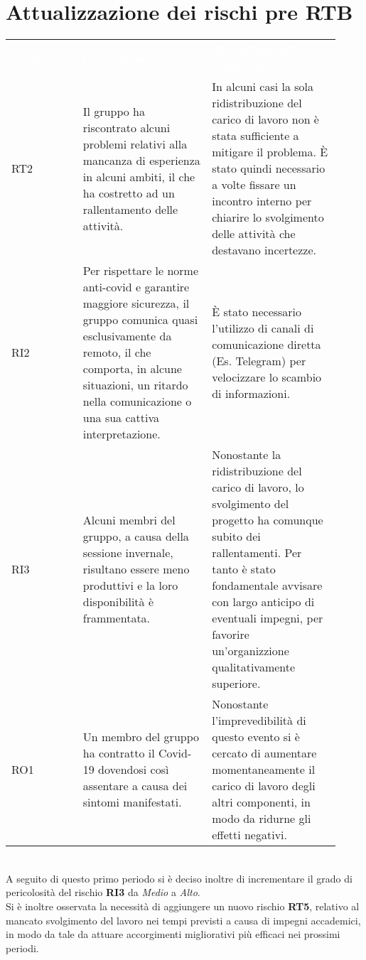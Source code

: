 \section{Attualizzazione dei rischi pre RTB}
\label{sec:AttualizzazioneRischiRTB}

{\renewcommand{\arraystretch}{1.5} \small
\begin{tabular}{ >{\centering}p{0.20\linewidth} | >{\centering}p{0.36\linewidth} | >{\centering}p{0.36\linewidth}}
	\rowcolor[RGB]{33, 73, 50}
	\textcolor{white}{\textbf{Codice}} & \textcolor{white}
	{\textbf{Descrizione}} & \textcolor{white}{\textbf{Accorginmenti migliorativi}}\tabularnewline
	\rowcolor[RGB]{216, 235, 171}
	RT2
    & Il gruppo ha riscontrato alcuni problemi relativi alla mancanza di esperienza in alcuni ambiti, il che ha costretto ad un rallentamento delle attività.  
    & In alcuni casi la sola ridistribuzione del carico di lavoro non è stata sufficiente a mitigare il problema. È stato quindi necessario a volte fissare un incontro interno per chiarire lo svolgimento delle attività che destavano incertezze.
    \tabularnewline
    \rowcolor[RGB]{233, 245, 206}
	RI2
    & Per rispettare le norme anti-covid e garantire maggiore sicurezza, il gruppo comunica quasi esclusivamente da remoto, il che comporta, in alcune situazioni, un ritardo nella comunicazione o una sua cattiva interpretazione.
    & È stato necessario l'utilizzo di canali di comunicazione diretta (Es. Telegram) per velocizzare lo scambio di informazioni. \tabularnewline
    \rowcolor[RGB]{216, 235, 171}
    RI3
	& Alcuni membri del gruppo, a causa della sessione invernale, risultano essere meno produttivi e la loro disponibilità è frammentata. 
    & Nonostante la ridistribuzione del carico di lavoro, lo svolgimento del progetto ha comunque subito dei rallentamenti. Per tanto è stato fondamentale avvisare con largo anticipo di eventuali impegni, per favorire un'organizzione qualitativamente superiore.
    \tabularnewline
	\rowcolor[RGB]{233, 245, 206}
    RO1
	& Un membro del gruppo ha contratto il Covid-19 dovendosi così assentare a causa dei sintomi manifestati.
    & Nonostante l'imprevedibilità di questo evento si è cercato di aumentare momentaneamente il carico di lavoro degli altri componenti, in modo da ridurne gli effetti negativi.
    \tabularnewline
\end{tabular}	
}
\\
\noindent
A seguito di questo primo periodo si è deciso inoltre di incrementare il grado di pericolosità del rischio \textbf{RI3} da \textit{Medio} a \textit{Alto}.\\
Si è inoltre osservata la necessità di aggiungere un nuovo rischio \textbf{RT5}, relativo al mancato svolgimento del lavoro nei tempi previsti a causa di impegni accademici, in modo da tale da attuare accorgimenti migliorativi più efficaci nei prossimi periodi.

